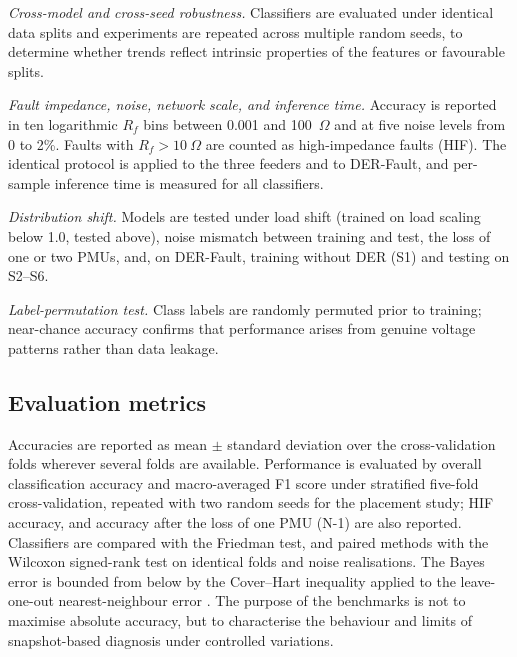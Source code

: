 \documentclass[11pt]{article}
\newenvironment{nw}{}{}
\begin{document}
\textit{Cross-model and cross-seed robustness.} Classifiers are evaluated under identical data splits and experiments are repeated across multiple random seeds, to determine whether trends reflect intrinsic properties of the features or favourable splits.

\begin{nw}
\textit{Fault impedance, noise, network scale, and inference time.} Accuracy is reported in ten logarithmic $R_f$ bins between 0.001 and 100~$\Omega$ and at five noise levels from 0 to 2\%. Faults with $R_f>10~\Omega$ are counted as high-impedance faults (HIF). The identical protocol is applied to the three feeders and to DER-Fault, and per-sample inference time is measured for all classifiers.

\textit{Distribution shift.} Models are tested under load shift (trained on load scaling below 1.0, tested above), noise mismatch between training and test, the loss of one or two PMUs, and, on DER-Fault, training without DER (S1) and testing on S2--S6.
\end{nw}

\textit{Label-permutation test.} Class labels are randomly permuted prior to training; near-chance accuracy confirms that performance arises from genuine voltage patterns rather than data leakage.

\subsection{Evaluation metrics}\label{subsec4_3}

\begin{nw}
Accuracies are reported as mean $\pm$ standard deviation over the cross-validation folds wherever several folds are available. Performance is evaluated by overall classification accuracy and macro-averaged F1 score under stratified five-fold cross-validation, repeated with two random seeds for the placement study; HIF accuracy, and accuracy after the loss of one PMU (N-1) are also reported. Classifiers are compared with the Friedman test, and paired methods with the Wilcoxon signed-rank test on identical folds and noise realisations. The Bayes error is bounded from below by the Cover--Hart inequality applied to the leave-one-out nearest-neighbour error \cite{coverhart1967}. The purpose of the benchmarks is not to maximise absolute accuracy, but to characterise the behaviour and limits of snapshot-based diagnosis under controlled variations.
\end{nw}
\end{document}
